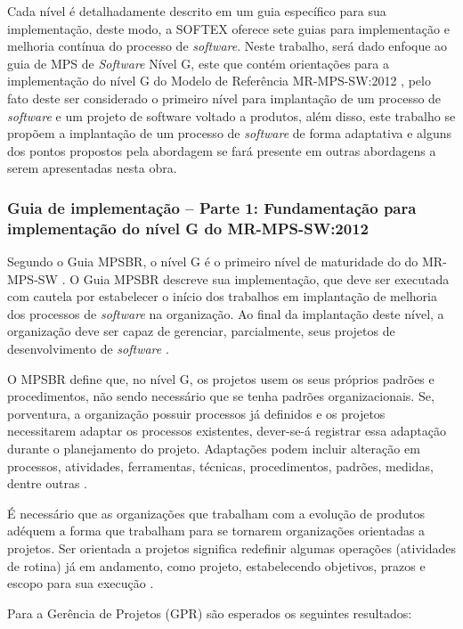 \documentclass{acm_proc_article-sp}
\begin{document}
Cada nível é detalhadamente descrito em um guia específico para sua implementação, deste modo, a SOFTEX oferece sete guias para implementação e melhoria contínua do processo de \textit{software}. Neste trabalho, será dado enfoque ao guia de MPS de \textit{Software} Nível G, este que contém orientações para a implementação do nível G do Modelo de Referência MR-MPS-SW:2012  \cite{mpsbr:nAgil}, pelo fato deste ser considerado o primeiro nível para implantação de um processo de \textit{software} e um projeto de software voltado a produtos, além disso, este trabalho se propõem a implantação de um processo de \textit{software} de forma adaptativa e alguns dos pontos propostos pela abordagem se fará presente em outras abordagens a serem apresentadas nesta obra.  

\subsubsection*{Guia de implementação – Parte 1: Fundamentação para implementação do nível G do MR-MPS-SW:2012}
Segundo o Guia MPSBR, o nível G é o primeiro nível de maturidade do do MR-MPS-SW \cite{mpsbr:nAgil}. O Guia MPSBR descreve sua implementação, que deve ser executada com cautela por estabelecer o início dos trabalhos em implantação de melhoria dos processos de \textit{software} na organização. Ao final da implantação deste nível, a organização deve ser capaz de gerenciar, parcialmente, seus projetos de desenvolvimento de \textit{software} \cite{mpsbr:nAgil}.

O MPSBR define que, no nível G, os projetos usem os seus próprios padrões e procedimentos, não
sendo necessário que se tenha padrões organizacionais. Se, porventura, a organização possuir processos já definidos e os projetos necessitarem adaptar os processos existentes, dever-se-á registrar essa adaptação durante o planejamento do projeto. Adaptações podem incluir alteração em processos, atividades, ferramentas, técnicas, procedimentos, padrões, medidas, dentre outras \cite{mpsbr:nAgil}.

É necessário que as organizações que trabalham com a evolução de produtos adéquem a forma que trabalham para se tornarem organizações orientadas a projetos. Ser orientada a projetos significa redefinir algumas operações (atividades
de rotina) já em andamento, como projeto, estabelecendo objetivos, prazos e escopo
para sua execução \cite{mpsbr:nAgil}.

Para a Gerência de Projetos (GPR) são esperados os seguintes resultados:
\end{document}

